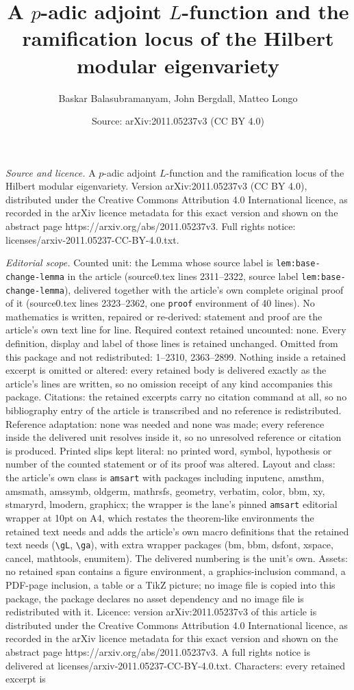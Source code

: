 \documentclass[10pt,a4paper]{amsart}
\title[A $p$-adic adjoint $L$-function and the ramification locus o]{A $p$-adic adjoint $L$-function and the ramification locus of the Hilbert modular eigenvariety}
\author{Baskar Balasubramanyam, John Bergdall, Matteo Longo}
\date{Source: arXiv:2011.05237v3 (CC BY 4.0)}
\begin{document}
\maketitle

\noindent\emph{Source and licence.} A $p$-adic adjoint $L$-function and the ramification locus of the Hilbert modular eigenvariety. Version arXiv:2011.05237v3 (CC BY 4.0), distributed under the Creative Commons Attribution 4.0 International licence, as recorded in the arXiv licence metadata for this exact version and shown on the abstract page https://arxiv.org/abs/2011.05237v3. Full rights notice: licenses/arxiv-2011.05237-CC-BY-4.0.txt.\par\smallskip

\noindent\textit{Editorial scope.} Counted unit: the Lemma whose source label is \texttt{lem:base-change-lemma} in the article (source0.tex lines 2311--2322, source label \texttt{lem:base-change-lemma}), delivered together with the article's own complete original proof of it (source0.tex lines 2323--2362, one \texttt{proof} environment of 40 lines). No mathematics is written, repaired or re-derived: statement and proof are the article's own text line for line. Required context retained uncounted: none. Every definition, display and label of those lines is retained unchanged. Omitted from this package and not redistributed: 1--2310, 2363--2899. Nothing inside a retained excerpt is omitted or altered: every retained body is delivered exactly as the article's lines are written, so no omission receipt of any kind accompanies this package. Citations: the retained excerpts carry no citation command at all, so no bibliography entry of the article is transcribed and no reference is redistributed. Reference adaptation: none was needed and none was made; every reference inside the delivered unit resolves inside it, so no unresolved reference or citation is produced. Printed slips kept literal: no printed word, symbol, hypothesis or number of the counted statement or of its proof was altered. Layout and class: the article's own class is \texttt{amsart} with packages including inputenc, amsthm, amsmath, amssymb, oldgerm, mathrsfs, geometry, verbatim, color, bbm, xy, stmaryrd, lmodern, graphicx; the wrapper is the lane's pinned \texttt{amsart} editorial wrapper at 10pt on A4, which restates the theorem-like environments the retained text needs and adds the article's own macro definitions that the retained text needs (\texttt{\textbackslash gL}, \texttt{\textbackslash ga}), with extra wrapper packages (bm, bbm, dsfont, xspace, cancel, mathtools, enumitem). The delivered numbering is the unit's own. Assets: no retained span contains a figure environment, a graphics-inclusion command, a PDF-page inclusion, a table or a TikZ picture; no image file is copied into this package, the package declares no asset dependency and no image file is redistributed with it. Licence: version arXiv:2011.05237v3 of this article is distributed under the Creative Commons Attribution 4.0 International licence, as recorded in the arXiv licence metadata for this exact version and shown on the abstract page https://arxiv.org/abs/2011.05237v3. A full rights notice is delivered at licenses/arxiv-2011.05237-CC-BY-4.0.txt. Characters: every retained excerpt is 
\end{document}
